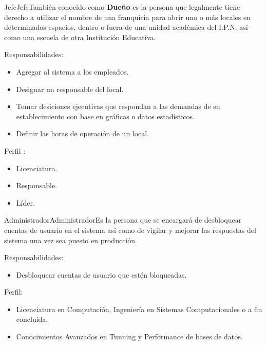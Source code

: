 \begin{Actor}{Jefe}{Jefe}{También conocido como \textbf{Dueño} es la persona que legalmente tiene derecho a utilizar el nombre de una franquicia para abrir uno o más locales en determinados espacios, dentro o fuera de una unidad académica del I.P.N. así como una escuela de otra Institución Educativa.}
	\item[Responsabilidades:] \hspace{1pt}
		\begin{itemize}
			\item Agregar al sistema a los empleados.
			\item Designar un responsable del local.
			\item Tomar desiciones ejecutivas que respondan a las demandas de su establecimiento con base en 			gráficas o datos estadísticos.
			\item Definir las horas de operación de un local.
		\end{itemize}
	\item[Perfil]:\hspace{1pt}
		\begin{itemize}
			\item Licenciatura.
			\item Responsable.
			\item Líder.
		\end{itemize}
\end{Actor}


\begin{Actor}{Administrador}{Administrador}{Es la persona que se encargará de desbloquear cuentas de usuario en el sistema así como de vigilar y mejorar las respuestas del sistema una vez sea puesto en producción.}
	\item[Responsabilidades:]\hspace{1pt}
		\begin{itemize}
			\item Desbloquear cuentas de usuario que estén bloqueadas.
		\end{itemize}
	\item[Perfil:]\hspace{1pt}
		\begin{itemize}
			\item Licenciatura en Computación, Ingeniería en Sistemas Computacionales o a fin concluida.
			\item Conocimientos Avanzados en Tunning y Performance de bases de datos.
		\end{itemize}
\end{Actor}


